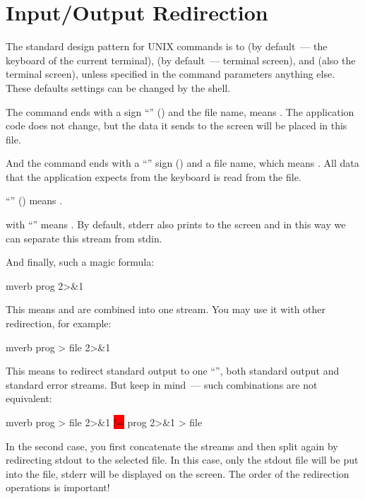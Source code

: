 \section*{Input/Output Redirection}

The standard design pattern for UNIX commands is to  (by default~--- the keyboard of the current
terminal),  (by default~--- terminal screen),
and  (also the terminal screen),
unless specified in the command parameters anything else.
These defaults settings can be changed by the shell.

The command ends with a sign ``'' (\struct{$>$}) and
the file name, means .
The application code does not change, but the data it sends to the screen
will be placed in this file.

And the command ends with a ``'' sign (\struct{$<$}) and
a file name, which means .
All data that the application expects from the keyboard is read from the file.

 ``'' (\struct{>\hspace{-0.4ex}>}) means
.

 with ``'' means . By default, stderr also prints to the screen and in
this way we can separate this stream from stdin.

And finally, such a magic formula:
\begin{code}{mverb}
prog 2>&1
\end{code}
This means  and  are combined into one stream.
You may use it with other redirection, for example:
\begin{code}{mverb}
prog > file 2>&1
\end{code}
This means to redirect standard output to one ``'', both standard
output and standard error streams. But keep in mind~--- such combinations
are not equivalent:
\begin{code}{mverb}
prog > file 2>&1 \colorbox{red}{!=} prog 2>&1 > file
\end{code}
In the second case, you first concatenate the streams and then split again
by redirecting stdout to the selected file. In this case, only the stdout file
will be put into the file, stderr will be displayed on the screen.
The order of the redirection operations is important!

